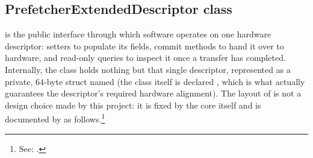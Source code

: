 \subsection{PrefetcherExtendedDescriptor class}
\label{subsec:fpgasteel-prefetcher-extended-descriptor}

 is the public interface through which software operates on one hardware descriptor: setters to populate its fields, commit methods to hand it over to hardware, and read-only queries to inspect it once a transfer has completed. Internally, the class holds nothing but that single descriptor, represented as a private, 64-byte struct named  (the class itself is declared , which is what actually guarantees the descriptor's required hardware alignment). The layout of  is not a design choice made by this project: it is fixed by the   core itself and is documented by  as follows.\footnote{See: \cite{EP-IPUG}.}

